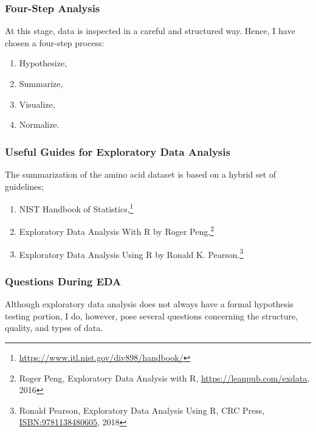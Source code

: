 \documentclass[]{article}
\providecommand{\tightlist}{%
  \setlength{\itemsep}{0pt}\setlength{\parskip}{0pt}}
\begin{document}
\hypertarget{four-step-analysis}{%
\subsubsection{Four-Step Analysis}\label{four-step-analysis}}

At this stage, data is inspected in a careful and structured way. Hence,
I have chosen a four-step process:

\begin{enumerate}
\def\labelenumi{\arabic{enumi}.}
\tightlist
\item
  Hypothesize,
\item
  Summarize,
\item
  Visualize,
\item
  Normalize.
\end{enumerate}

\hypertarget{useful-guides-for-exploratory-data-analysis}{%
\subsubsection{Useful Guides for Exploratory Data
Analysis}\label{useful-guides-for-exploratory-data-analysis}}

The summarization of the amino acid dataset is based on a hybrid set of
guidelines;

\begin{enumerate}
\def\labelenumi{\arabic{enumi}.}
\tightlist
\item
  NIST Handbook of Statistics,\footnote{\url{https://www.itl.nist.gov/div898/handbook/}}
\item
  Exploratory Data Analysis With R by Roger Peng,\footnote{Roger Peng,
    Exploratory Data Analysis with R, \url{https://leanpub.com/exdata},
    2016}
\item
  Exploratory Data Analysis Using R by Ronald K. Pearson.\footnote{Ronald
    Pearson, Exploratory Data Analysis Using R, CRC Press,
    \url{ISBN:9781138480605}, 2018}
\end{enumerate}

\hypertarget{questions-during-eda}{%
\subsubsection{Questions During EDA}\label{questions-during-eda}}

Although exploratory data analysis does not always have a formal
hypothesis testing portion, I do, however, pose several questions
concerning the structure, quality, and types of data.
\end{document}
